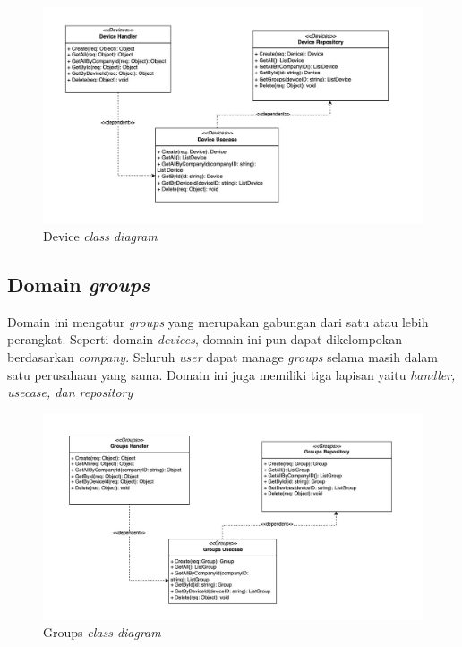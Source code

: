\begin{figure}[h]
  \centering
  \includegraphics[width=1\textwidth]{resources/chapter-3/class/device-class-diagram.jpg}
  \caption{Device \textit{class diagram}}
  \label{fig:device-class-diagram}
\end{figure}

\subsection{Domain \textit{groups}}

Domain ini mengatur \textit{groups} yang merupakan gabungan dari satu atau lebih perangkat. Seperti domain \textit{devices}, domain ini pun dapat dikelompokan berdasarkan \textit{company}. Seluruh \textit{user} dapat manage \textit{groups} selama masih dalam satu perusahaan yang sama. Domain ini juga memiliki tiga lapisan yaitu \textit{handler, usecase, dan repository}

\begin{figure}[h]
  \centering
  \includegraphics[width=1\textwidth]{resources/chapter-3/class/groups-class-diagram.jpg}
  \caption{Groups \textit{class diagram}}
  \label{fig:groups-class-diagram}
\end{figure}


